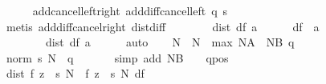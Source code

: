 \begin{isabellebody}
\ \ \ \ \isamarkupfalse%
\ add{\isacharunderscore}{\kern0pt}cancel{\isacharunderscore}{\kern0pt}left{\isacharunderscore}{\kern0pt}right\ add{\isacharunderscore}{\kern0pt}diff{\isacharunderscore}{\kern0pt}cancel{\isacharunderscore}{\kern0pt}left{\isacharprime}{\kern0pt}\ q\ s\isanewline
\ \ \ \ \isamarkupfalse%
\ {\isacharparenleft}{\kern0pt}metis\ add{\isacharunderscore}{\kern0pt}diff{\isacharunderscore}{\kern0pt}cancel{\isacharunderscore}{\kern0pt}right{\isacharprime}{\kern0pt}\ dist{\isacharunderscore}{\kern0pt}diff{\isacharparenleft}{\kern0pt}{}{\isacharparenright}{\kern0pt}{\isacharparenright}{\kern0pt}\isanewline
\ \ \isamarkupfalse%
\ {\isasymdelta}\ \ {\isachardoublequoteopen}{\isasymdelta}\ {\isasymequiv}\ dist\ df\ a\ {\isacharslash}{\kern0pt}\ {}{\isachardoublequoteclose}\isanewline
\ \ \isamarkupfalse%
\ {\isacartoucheopen}df\ {\isasymnoteq}\ a{\isacartoucheclose}\ \isamarkupfalse%
\ {\isachardoublequoteopen}{\isasymdelta}\ {\isachargreater}{\kern0pt}\ {}{\isachardoublequoteclose}\ \ {\isasymdelta}{\isacharcolon}{\kern0pt}\ {\isachardoublequoteopen}{\isasymdelta}{\isacharplus}{\kern0pt}{\isasymdelta}\ {\isasymle}\ dist\ df\ a{\isachardoublequoteclose}\isanewline
\ \ \ \ \isamarkupfalse%
\ auto\isanewline
\ \ \isamarkupfalse%
\ N\ \ {\isachardoublequoteopen}N\ {\isasymequiv}\ max\ {\isacharparenleft}{\kern0pt}NA\ {\isasymdelta}{\isacharparenright}{\kern0pt}\ {\isacharparenleft}{\kern0pt}NB\ {\isacharparenleft}{\kern0pt}q\ {\isasymdelta}{\isacharparenright}{\kern0pt}{\isacharparenright}{\kern0pt}{\isachardoublequoteclose}\isanewline
\ \ \isamarkupfalse%
\ \isamarkupfalse%
\ {\isachardoublequoteopen}norm\ {\isacharparenleft}{\kern0pt}s\ N{\isacharparenright}{\kern0pt}\ {\isacharless}{\kern0pt}\ q\ {\isasymdelta}{\isachardoublequoteclose}\isanewline
\ \ \ \ \isamarkupfalse%
\ {\isacharparenleft}{\kern0pt}simp\ add{\isacharcolon}{\kern0pt}\ NB\ {\isacartoucheopen}{\isasymdelta}\ {\isachargreater}{\kern0pt}\ {}{\isacartoucheclose}\ qpos{\isacharparenright}{\kern0pt}\isanewline
\ \ \isamarkupfalse%
\ \isamarkupfalse%
\ {\isachardoublequoteopen}dist\ {\isacharparenleft}{\kern0pt}{\isacharparenleft}{\kern0pt}f\ {\isacharparenleft}{\kern0pt}z\ {\isacharplus}{\kern0pt}\ s\ N{\isacharparenright}{\kern0pt}\ {\isacharminus}{\kern0pt}\ f\ z{\isacharparenright}{\kern0pt}\ {\isacharslash}{\kern0pt}\ s\ N{\isacharparenright}{\kern0pt}\ df\ {\isacharless}{\kern0pt}\ {\isasymdelta}{\isachardoublequoteclose}\isanewline

\end{isabellebody}
